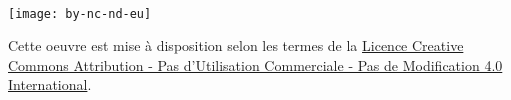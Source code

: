 ~\vfill
\begin{center}
	\begin{minipage}[c]{0.25\linewidth}
		\raggedright\texttt{[image: by-nc-nd-eu]}
	\end{minipage}\hfill
\end{center}

Cette oeuvre est mise à disposition selon les termes de la \href{https://creativecommons.org/licenses/by-nc-nd/4.0/deed.fr}{Licence Creative Commons Attribution - Pas d’Utilisation Commerciale - Pas de Modification 4.0 International}. %
